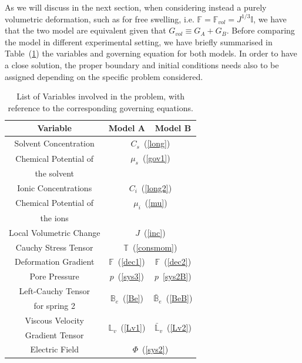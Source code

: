 \documentclass[runningheads]{llncs}
\newcommand{\F}{\ensuremath{\mathbb{F}}}
\newcommand{\LL}{\ensuremath{\mathbb{L}}}
\begin{document}
As we will discuss in the next section, when considering instead a purely volumetric deformation, such as for free swelling, i.e. $\F=\F_{vol}=J^{1/3}\mathbb{I}$, we have that the two model are equivalent given that $G_{vol}\equiv G_A +G_B$. Before comparing the model in different experimental setting, we have briefly summarised in Table~(\ref{summary}) the variables and governing equation for both models. In order to have a close solution, the proper boundary and initial conditions needs also to be assigned depending on the specific problem considered.

\vspace{3mm}
\begin{table}
	\centering
	\begin{tabular}{c|c|c}
		\hline\addlinespace[2pt]
		Variable &  \hspace{1pt} Model A \hspace{1pt} & \hspace{1pt} Model B\hspace{1pt} \\
		\hline
		\hline\addlinespace[2.5pt]
		Solvent Concentration &  \multicolumn{2}{c}{$C_s$~(\ref{long})}\\[2.5pt]
		Chemical Potential of & \multicolumn{2}{c}{ $\mu_s$~(\ref{gov1})}\\
		the solvent &\multicolumn{2}{c}{}\\[2pt]
		Ionic Concentrations &\multicolumn{2}{c}{$C_i$~(\ref{long2})}\\[3pt]
		Chemical Potential of & \multicolumn{2}{c}{$\mu_i$~(\ref{mu}) }\\
		the ions &\multicolumn{2}{c}{ }\\[2pt]
		\hline\addlinespace[2pt]
		Local Volumetric Change & \multicolumn{2}{c}{$J$~(\ref{inc})}\\[2.5pt]
		Cauchy Stress Tensor & 	\multicolumn{2}{c}{$\mathbb{T}$~(\ref{consmom})}\\[2.5pt]
		Deformation Gradient & $\F$~(\ref{dec1})& $\F$~(\ref{dec2})\\[2.5pt]
	 	Pore Pressure & $p$~(\ref{sys3}) & $p$~\ref{sys2B})\\[2.5pt]
		Left-Cauchy Tensor& \multirow{2}{*}{$\mathbb{B}_e$~(\ref{Be})} & \multirow{2}{*}{$\mathbb{\bar{B}}_e$~(\ref{BeB})}\\
		for spring 2&&\\
		Viscous Velocity & \multirow{2}{*}{$\LL_v$~(\ref{Lv1})}&  \multirow{2}{*}{$\bar{\LL}_v$~(\ref{Lv2})}\\
		Gradient Tensor&&\\
		\hline\addlinespace[2pt]
		Electric Field & \multicolumn{2}{c}{$\Phi$~(\ref{sys2})}\\
		\hline 
		\hline
	\end{tabular}
\vspace{3mm}
\caption{List of Variables involved in the problem, with reference to the corresponding governing equations.}
\label{summary}
\end{table}
\end{document}
